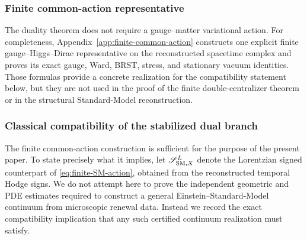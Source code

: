 \documentclass[11pt]{article}
\theoremstyle{definition}
\theoremstyle{remark}
\begin{document}
\subsubsection{Finite common-action representative}

The duality theorem does not require a gauge--matter variational action.
For completeness, Appendix~\ref{app:finite-common-action} constructs one
explicit finite gauge--Higgs--Dirac representative on the reconstructed
spacetime complex and proves its exact gauge, Ward, BRST, stress, and stationary
vacuum identities.  Those formulas provide a concrete realization for the
compatibility statement below, but they are not used in the proof of the
finite double-centralizer theorem or in the structural Standard-Model
reconstruction.

\subsubsection{Classical compatibility of the stabilized dual branch}
\label{sec:classical-compatibility}

The finite common-action construction is sufficient for the purpose of the
present paper.  To state precisely what it implies, let
$\mathscr S_{{\rm SM},X}^{L}$ denote the Lorentzian signed counterpart of
\eqref{eq:finite-SM-action}, obtained from the reconstructed temporal Hodge
signs.  We do not attempt here to prove the independent geometric and PDE
estimates required to construct a general Einstein--Standard-Model continuum
from microscopic renewal data.  Instead we record the exact compatibility
implication that any such certified continuum realization must satisfy.
\end{document}
